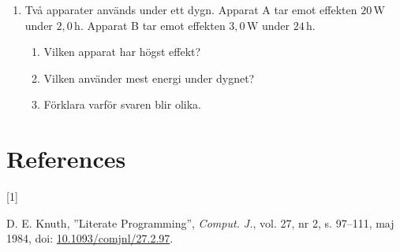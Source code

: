 \documentclass[
  swedish,
  11pt,
  a4paper,
  DIV=11,
  numbers=noendperiod,
  twoside,
  open=any]{scrreprt}
\newlength{\cslhangindent}
\newlength{\csllabelwidth}
\newenvironment{CSLReferences}[2] %
 {\begin{list}{}{%
  \setlength{\itemindent}{0pt}
  \setlength{\leftmargin}{0pt}
  \setlength{\parsep}{0pt}
  \ifodd #1
   \setlength{\leftmargin}{\cslhangindent}
   \setlength{\itemindent}{-1\cslhangindent}
  \fi
  \setlength{\itemsep}{#2\baselineskip}}}
 {\end{list}}
\newcommand{\CSLLeftMargin}[1]{\parbox[t]{\csllabelwidth}{\strut#1\strut}}
\newcommand{\CSLRightInline}[1]{\parbox[t]{\linewidth - \csllabelwidth}{\strut#1\strut}}
\begin{document}
\begin{enumerate}
  \begin{enumerate}
  \def\labelenumii{\alph{enumii}.}
  \item
    Beräkna tillförd effekt.
  \item
    Beräkna förlusteffekten.
  \end{enumerate}
\item
  Två apparater används under ett dygn. Apparat A tar emot effekten
  \(20\,\mathrm{W}\) under \(2{,}0\,\mathrm{h}\). Apparat B tar emot
  effekten \(3{,}0\,\mathrm{W}\) under \(24\,\mathrm{h}\).

  \begin{enumerate}
  \def\labelenumii{\alph{enumii}.}
  \item
    Vilken apparat har högst effekt?
  \item
    Vilken använder mest energi under dygnet?
  \item
    Förklara varför svaren blir olika.
  \end{enumerate}
\end{enumerate}


\chapter*{References}\label{references}


\protect{}\label{refs}
\begin{CSLReferences}{0}{0}
\CSLLeftMargin{{[}1{]} }%
\CSLRightInline{D. E. Knuth, {''Literate Programming''}, \emph{Comput.
J.}, vol. 27, nr 2, s. 97--111, maj 1984, doi:
\href{https://doi.org/10.1093/comjnl/27.2.97}{10.1093/comjnl/27.2.97}.}

\end{CSLReferences}
\end{document}
